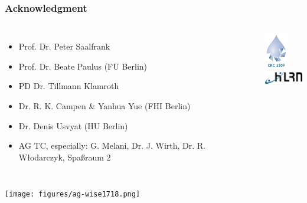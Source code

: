 \documentclass[hyperref={pdfpagelabels=false}]{beamer}
\begin{document}
\begin{frame}
 \frametitle{Acknowledgment}
 \begin{columns}
 \begin{itemize}
  \item Prof. Dr. Peter Saalfrank
  \item Prof. Dr. Beate Paulus (FU Berlin)
  \item PD Dr. Tillmann Klamroth
  \item Dr. R. K. Campen \& Yanhua Yue (FHI Berlin)
  \item Dr. Denis Usvyat (HU Berlin)
  \item AG TC, especially: G. Melani, Dr. J. Wirth, Dr. R. W\l{}odarczyk, Spa\ss{}raum 2
 \end{itemize}
 \centering
\includegraphics[width=1cm]{figures/crc1109.png}
\\
\includegraphics[width=2cm]{figures/hlrn_logo.png}
\end{columns}
\centering
\texttt{[image: figures/ag-wise1718.png]}

\end{frame}

 
\end{document}
